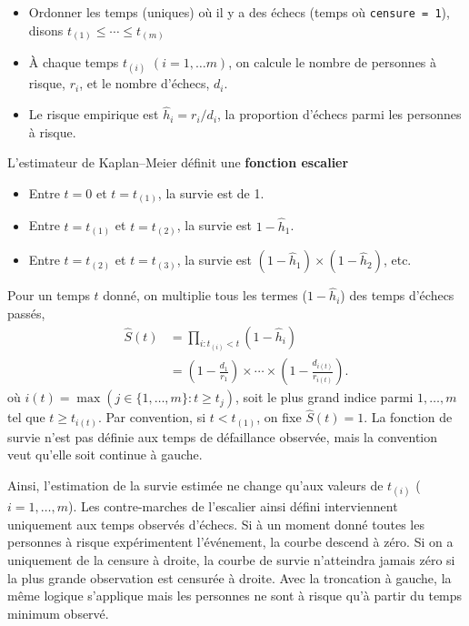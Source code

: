 \documentclass[
  11pt,
  letterpaper,
]{scrbook}
\providecommand{\tightlist}{%
  \setlength{\itemsep}{0pt}\setlength{\parskip}{0pt}}\usepackage{longtable,booktabs,array}
\theoremstyle{definition}
\theoremstyle{remark}
\begin{document}
\begin{itemize}
\tightlist
\item
  Ordonner les temps (uniques) où il y a des échecs (temps où
  \texttt{censure\ =\ 1}), disons \(t_{(1)} \leq \cdots \leq t_{(m)}\)
\item
  À chaque temps \(t_{(i)}\) \((i=1, \ldots m)\), on calcule le nombre
  de personnes à risque, \(r_i\), et le nombre d'échecs, \(d_i\).
\item
  Le risque empirique est \(\widehat{h}_i = r_i/d_i\), la proportion
  d'échecs parmi les personnes à risque.
\end{itemize}

L'estimateur de Kaplan--Meier définit une \textbf{fonction escalier}

\begin{itemize}
\tightlist
\item
  Entre \(t=0\) et \(t=t_{(1)}\), la survie est de 1.
\item
  Entre \(t=t_{(1)}\) et \(t=t_{(2)}\), la survie est
  \(1-\widehat{h}_1\).
\item
  Entre \(t=t_{(2)}\) et \(t=t_{(3)}\), la survie est
  \((1-\widehat{h}_1) \times (1-\widehat{h}_2)\), etc.
\end{itemize}

Pour un temps \(t\) donné, on multiplie tous les termes
(\(1-\widehat{h}_i\)) des temps d'échecs passés, \begin{align*}
 \widehat{S}(t) &= \prod_{i: t_{(i)} < t} \left( 1- \widehat{h}_i\right) \\ &= \left( 1- \frac{d_1}{r_1}\right) \times \cdots \times \left( 1- \frac{d_{i(t)}}{r_{i(t)}}\right).
\end{align*} où \(i(t) =\max(j \in \{1, \ldots, m\}: t \geq t_{j})\),
soit le plus grand indice parmi \(1, \ldots, m\) tel que
\(t \geq t_{i(t)}\). Par convention, si \(t < t_{(1)}\), on fixe
\(\widehat{S}(t)=1\). La fonction de survie n'est pas définie aux temps
de défaillance observée, mais la convention veut qu'elle soit continue à
gauche.

Ainsi, l'estimation de la survie estimée ne change qu'aux valeurs de
\(t_{(i)}\) (\(i=1, \ldots, m\)). Les contre-marches de l'escalier ainsi
défini interviennent uniquement aux temps observés d'échecs. Si à un
moment donné toutes les personnes à risque expérimentent l'événement, la
courbe descend à zéro. Si on a uniquement de la censure à droite, la
courbe de survie n'atteindra jamais zéro si la plus grande observation
est censurée à droite. Avec la troncation à gauche, la même logique
s'applique mais les personnes ne sont à risque qu'à partir du temps
minimum observé.
\end{document}
